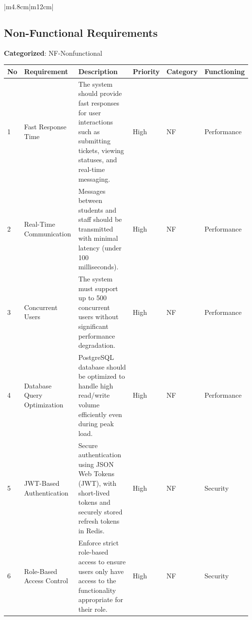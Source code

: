 \begin{longtable}{{|m{4.8cm}|m{12cm}|}}
	\\ \hline
	
	
	\caption{Functional Requirements by User Roles} %
	\label{tab:functionalRequirements}
\end{longtable}



\subsection{Non-Functional Requirements}
\noindent \textbf{Categorized}: NF-Nonfunctional




	\begin{longtable}{|m{0.5cm}|m{2.5cm}|m{7cm}|m{1.5cm}|m{1.7cm}|m{2.4cm}|}
		\hline
		\textbf{No} & \textbf{Requirement}                & \textbf{Description}                                                                                                                               & \textbf{Priority} & \textbf{Category}  & \textbf{Functioning} \\ \hline
		\endhead
		1  & Fast Response Time          & The system should provide fast responses for user interactions such as submitting tickets, viewing statuses, and real-time messaging.      & High     & NF        & Performance \\ \hline
		2  & Real-Time Communication     & Messages between students and staff should be transmitted with minimal latency (under 100 milliseconds).                                   & High     & NF        & Performance \\ \hline
		3  & Concurrent Users            & The system must support up to 500 concurrent users without significant performance degradation.                                            & High     & NF        & Performance \\ \hline
		4  & Database Query Optimization & PostgreSQL database should be optimized to handle high read/write volume efficiently even during peak load.                                & High     & NF        & Performance \\ \hline
		5  & JWT-Based Authentication    & Secure authentication using JSON Web Tokens (JWT), with short-lived tokens and securely stored refresh tokens in Redis.                    & High     & NF        & Security    \\ \hline
		6  & Role-Based Access Control   & Enforce strict role-based access to ensure users only have access to the functionality appropriate for their role.                         & High     & NF        & Security    \\ \hline

\end{longtable}
